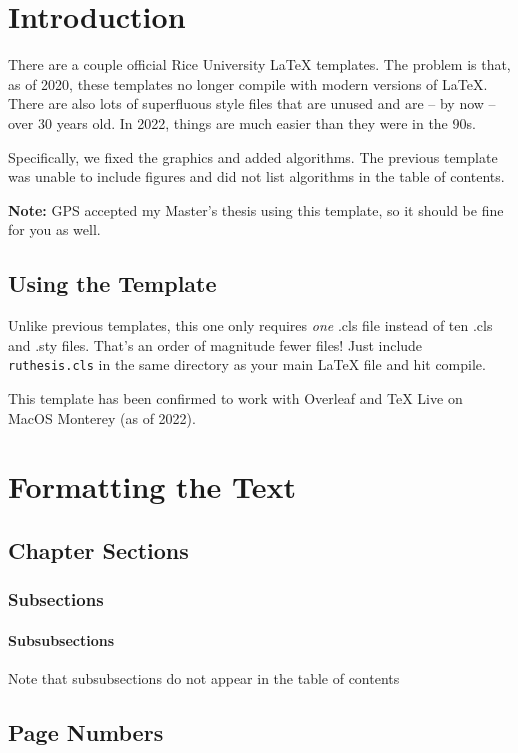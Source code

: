 \documentclass[12pt]{ruthesis}
\begin{document}

\chapter{Introduction}

There are a couple official Rice University LaTeX templates. The problem is that, as of 2020, these templates no longer compile with modern versions of LaTeX. There are also lots of superfluous style files that are unused and are -- by now -- over 30 years old. In 2022, things are much easier than they were in the 90s.

Specifically, we fixed the graphics and added algorithms. The previous template was unable to include figures and did not list algorithms in the table of contents.

\textbf{Note:} GPS accepted my Master's thesis using this template, so it should be fine for you as well.

\section{Using the Template}
Unlike previous templates, this one only requires \textit{one} .cls file instead of ten .cls and .sty files. That's an order of magnitude fewer files! Just include \verb_ruthesis.cls_ in the same directory as your main LaTeX file and hit compile.

This template has been confirmed to work with Overleaf and TeX Live on MacOS Monterey (as of 2022).

\chapter{Formatting the Text}


\section{Chapter Sections}

\subsection{Subsections}

\subsubsection{Subsubsections}
Note that subsubsections do not appear in the table of contents


\section{Page Numbers}
\end{document}
